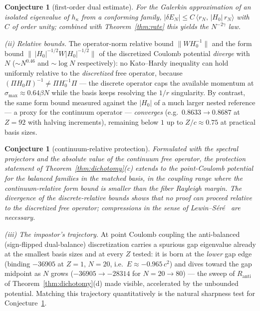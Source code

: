 \documentclass[11pt,reqno]{amsart}
\newtheorem{conjecture}[theorem]{Conjecture}
\theoremstyle{definition}
\theoremstyle{remark}
\newcommand{\norm}[1]{\lVert #1\rVert}
\newcommand{\ip}[2]{\langle #1,\,#2\rangle}
\begin{document}
\begin{conjecture}[first-order dual estimate]\label{conj:dual}
For the Galerkin approximation of an isolated eigenvalue of
$h_{\kappa}$ from a conforming family,
$|\delta E_{N}|\le C\,\ip{r_{N}}{|H_{0}|\,r_{N}}$ with $C$ of order
unity; combined with Theorem~\ref{thm:rate} this yields the
$N^{-2\gamma}$ law.
\end{conjecture}

\emph{(ii) Relative bounds.} The operator-norm relative bound
$\norm{W H_{0}^{-1}}$ and the form bound
$\norm{\,|H_{0}|^{-1/2}W|H_{0}|^{-1/2}}$ of the discretized Coulomb
potential \emph{diverge} with $N$ ($\sim N^{0.46}$ and $\sim\log N$
respectively): no Kato--Hardy inequality can hold uniformly relative to
the \emph{discretized} free operator, because
$(\Pi H_{0}\Pi)^{-1}\ne\Pi H_{0}^{-1}\Pi$ --- the discrete operator caps
the available momentum at $\sigma_{\max}\approx0.64\beta N$ while the
basis keeps resolving the $1/r$ singularity. By contrast, the same form
bound measured against the $|H_{0}|$ of a much larger nested reference
--- a proxy for the continuum operator --- \emph{converges} (e.g.\
$0.8633\to0.8687$ at $Z=92$ with halving increments), remaining below
$1$ up to $Z/c\approx0.75$ at practical basis sizes.

\begin{conjecture}[continuum-relative protection]\label{conj:coulomb}
Formulated with the spectral projectors and the absolute value of the
\emph{continuum} free operator, the protection statement of
Theorem~\ref{thm:dichotomy}(c) extends to the point-Coulomb potential
for the balanced families in the matched basis, in the coupling range
where the continuum-relative form bound is smaller than the fiber
Rayleigh margin. The divergence of the discrete-relative bounds shows
that no proof can proceed relative to the discretized free operator;
compressions in the sense of Lewin--S\'er\'e~\cite{LewinSere2010} are
necessary.
\end{conjecture}

\emph{(iii) The impostor's trajectory.} At point Coulomb coupling the
anti-balanced (sign-flipped dual-balance) discretization carries a
spurious gap eigenvalue already at the smallest basis sizes and at
every $Z$ tested: it is born at the \emph{lower} gap edge (binding
$-36905$ at $Z=1$, $N=20$, i.e.\ $E\approx-0.965\,c^{2}$) and dives
toward the gap midpoint as $N$ grows ($-36905\to-28314$ for
$N=20\to80$) --- the sweep of $R_{\mathrm{anti}}$ of
Theorem~\ref{thm:dichotomy}(d) made visible, accelerated by the
unbounded potential. Matching this trajectory quantitatively is the
natural sharpness test for Conjecture~\ref{conj:coulomb}.
\end{document}
